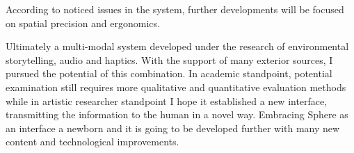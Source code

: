         According to noticed issues in the system, further developments will be focused on spatial precision and ergonomics.\par

        Ultimately a multi-modal system developed under the research of environmental storytelling, audio and haptics. With the support of many exterior sources, I pursued the potential of this combination. In academic standpoint, potential examination still requires more qualitative and quantitative evaluation methods while in artistic researcher standpoint I hope it established a new interface, transmitting the information to the human in a novel way. Embracing Sphere as an interface a newborn and it is going to be developed further with many new content and technological improvements.\par